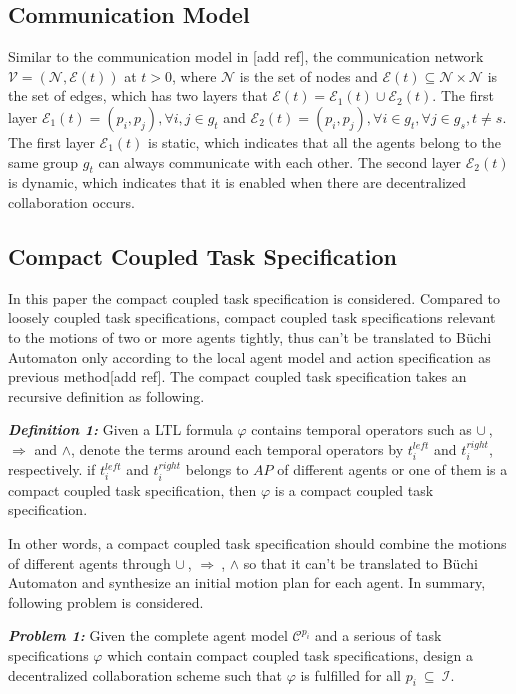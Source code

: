 \documentclass[journal]{IEEEtran}
\begin{document}
\subsection{Communication Model}
Similar to the communication model in [add ref], the communication network $\mathcal{V}=(\mathcal{N},\mathcal{E}(t))$ at $t>0$, where $\mathcal{N}$ is the set of nodes and $\mathcal{E}(t)\subseteq \mathcal{N} \times \mathcal{N}$ is the set of edges, which has two layers that $\mathcal{E}(t)=\mathcal{E}_1(t)\cup \mathcal{E}_2(t)$. The first layer $\mathcal{E}_1(t)={(p_i,p_j),\forall i,j\in g_t}$ and $\mathcal{E}_2(t)={(p_i,p_j),\forall i\in g_t,\forall j \in g_s, t\neq s}$. The first layer $\mathcal{E}_1(t)$ is static, which indicates that all the agents belong to the same group $g_t$ can always communicate with each other. The second layer $\mathcal{E}_2(t)$ is dynamic, which indicates that it is enabled when there are decentralized collaboration occurs.


\subsection{Compact Coupled Task Specification}
In this paper the compact coupled task specification is considered. Compared to loosely coupled task specifications, compact coupled task specifications relevant to the motions of two or more agents tightly, thus can't be translated to B\"{u}chi Automaton only according to the local agent model and action specification as previous method[add ref]. The compact coupled task specification takes an recursive definition as following.
\par
\textbf{\emph{Definition 1:}} Given a LTL formula $\varphi$ contains temporal operators such as $\cup \ $, $\Longrightarrow$ and  $\wedge$, denote the terms around each temporal operators by $t^{left}_i$ and $t^{right}_i$, respectively. if $t^{left}_i$ and $t^{right}_i$ belongs to $AP$ of different agents or one of them is a compact coupled task specification, then $\varphi$ is a compact coupled task specification.
\par
In other words, a compact coupled task specification should combine the motions of different agents through $\cup \ $, $\Longrightarrow \ $, $\wedge$ so that it can't be translated to B\"{u}chi Automaton and synthesize an initial motion plan for each agent. In summary, following problem is considered.
\par
\textbf{\emph{Problem 1:}}  Given the complete agent model $\mathcal{C}^{p_i}$ and a serious of task specifications $\varphi$ which contain compact coupled task specifications, design a decentralized collaboration scheme such that $\varphi$ is fulfilled for all $p_i \ \subseteq \ \mathcal{I}$.
\end{document}
